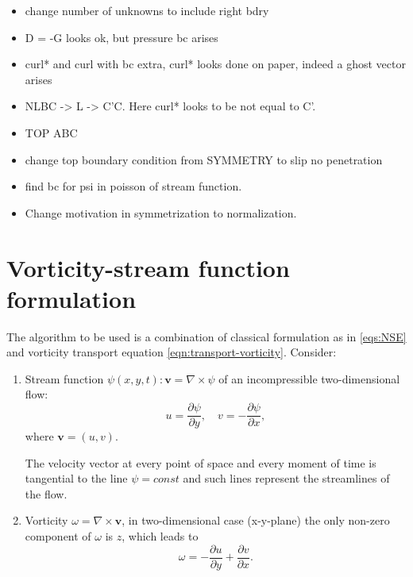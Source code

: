 \documentclass{article}
\numberwithin{equation}{section}
\begin{document}
{\begin{itemize}
    \item change number of unknowns to include right bdry
    \item D = -G looks ok, but pressure bc arises
    \item curl* and curl with bc extra, curl* looks done on paper, indeed a ghost vector arises
    \item NLBC -> L -> C'C. Here curl* looks to be not equal to C'.
    \item TOP ABC
    \item change top boundary condition from SYMMETRY to slip no penetration
    \item find bc for psi in poisson of stream function. 
    \item Change motivation in symmetrization to normalization.
  \end{itemize}
}




\pagebreak
\section{Vorticity-stream function formulation}\label{sec:vorticity-streamfunction}
	The algorithm to be used is a combination of classical formulation as in \cref{eqs:NSE} and vorticity transport equation \cref{eqn:transport-vorticity}.
	Consider:
	
	\begin{enumerate}
	\item	

	Stream function $\psi(x,y,t):\boldsymbol{v}=\nabla \times \psi$ of an incompressible two-dimensional flow:
	\begin{equation}
	\label{eqn:streamfunction}
		u = \frac{\partial \psi}{\partial y},\quad v=-\frac{\partial \psi}{\partial x},
	\end{equation}
	where $\boldsymbol{v}=(u,v)$.
	
	The velocity vector at every point of space and every moment of time is tangential to the line $\psi = const$ and such lines represent the streamlines of the flow. 
	\item
	
	Vorticity $\omega = \nabla \times \boldsymbol{v}$, in two-dimensional case (x-y-plane) the only non-zero component of $\omega$ is $z$, which leads to
	\begin{equation}
	\label{eqn:vorticity}
		\omega=- \frac{\partial u}{\partial y}+\frac{\partial v}{\partial x} .
	\end{equation}
	\end{enumerate}
	
\end{document}
